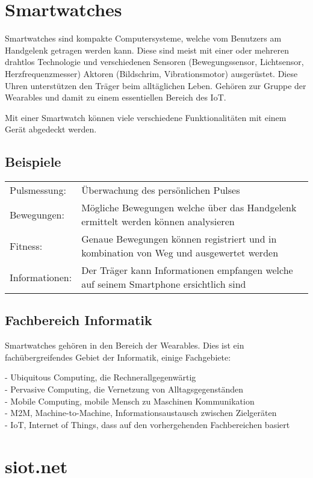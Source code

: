 \section{Smartwatches}
Smartwatches sind kompakte Computersysteme, welche vom Benutzers am Handgelenk getragen werden kann. Diese sind meist mit einer oder mehreren drahtlos Technologie und verschiedenen Sensoren (Bewegungssensor, Lichtsensor, Herzfrequenzmesser) Aktoren (Bildschrim, Vibrationsmotor) ausgerüstet.
Diese Uhren unterstützen den Träger beim alltäglichen Leben. Gehören zur Gruppe der Wearables und damit zu einem essentiellen Bereich des IoT.

Mit einer Smartwatch können viele verschiedene Funktionalitäten mit einem Gerät abgedeckt werden.
\subsection{Beispiele}
\begin{tabular}{ll}
Pulsmessung: &	Überwachung des persönlichen Pulses \\
Bewegungen:	& Mögliche Bewegungen welche über das Handgelenk ermittelt werden können analysieren \\
Fitness: & Genaue Bewegungen können registriert und in kombination von Weg und ausgewertet werden \\
Informationen: & Der Träger kann Informationen empfangen welche auf seinem Smartphone ersichtlich sind
\end{tabular}

\subsection{Fachbereich Informatik}
Smartwatches gehören in den Bereich der Wearables. Dies ist ein fachübergreifendes Gebiet der Informatik, einige Fachgebiete:

- Ubiquitous Computing, die Rechnerallgegenwärtig \\
- Pervasive Computing, die Vernetzung von Alltagsgegenständen \\
- Mobile Computing, mobile Mensch zu Maschinen Kommunikation \\
- M2M, Machine-to-Machine, Informationsaustausch zwischen Zielgeräten \\
- IoT, Internet of Things, dass auf den vorhergehenden Fachbereichen basiert

\section{siot.net}

